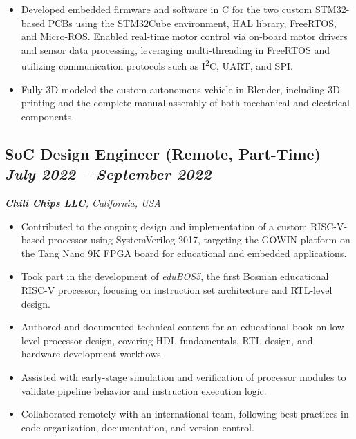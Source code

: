 \begin{itemize}[leftmargin=*,noitemsep,topsep=3pt]
    \item Developed embedded firmware and software in C for the two custom STM32-based PCBs using the STM32Cube environment, HAL library, FreeRTOS, and Micro-ROS. Enabled real-time motor control via on-board motor drivers and sensor data processing, leveraging multi-threading in FreeRTOS and utilizing communication protocols such as I\textsuperscript{2}C, UART, and SPI.
    \item Fully 3D modeled the custom autonomous vehicle in Blender, including 3D printing and the complete manual assembly of both mechanical and electrical components.
\end{itemize}
\vspace{20pt}


\subsection*{\textbf{SoC Design Engineer (Remote, Part-Time)} \hfill \textit{July 2022 -- September 2022}}  
\noindent\textit{\textbf{Chili Chips LLC}, California, USA} 
\begin{itemize}[leftmargin=*,noitemsep,topsep=3pt]
    \item Contributed to the ongoing design and implementation of a custom RISC-V-based processor using SystemVerilog 2017, targeting the GOWIN platform on the Tang Nano 9K FPGA board for educational and embedded applications.
    \item Took part in the development of \textit{eduBOS5}, the first Bosnian educational RISC-V processor, focusing on instruction set architecture and RTL-level design.
    \item Authored and documented technical content for an educational book on low-level processor design, covering HDL fundamentals, RTL design, and hardware development workflows.
    \item Assisted with early-stage simulation and verification of processor modules to validate pipeline behavior and instruction execution logic.
    \item Collaborated remotely with an international team, following best practices in code organization, documentation, and version control.
\end{itemize}
\vspace{20pt}

